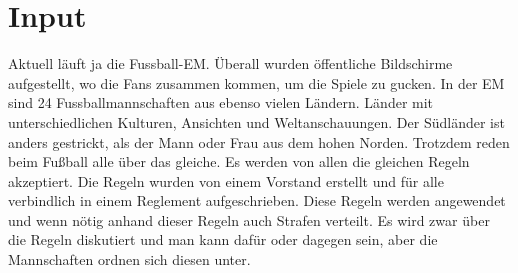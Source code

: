 \documentclass[12pt,a4paper]{scrarticle}
\begin{document}
\section{ Input }
\begin{spacing}{1.5}
Aktuell läuft ja die Fussball-EM. Überall wurden öffentliche Bildschirme aufgestellt, wo die Fans zusammen kommen, um die Spiele zu gucken. 
In der EM sind 24 Fussballmannschaften aus ebenso vielen Ländern. Länder mit unterschiedlichen Kulturen, Ansichten und Weltanschauungen. Der Südländer ist anders gestrickt, als der Mann oder Frau aus dem hohen Norden. Trotzdem reden beim Fußball alle über das gleiche. Es werden von allen die gleichen Regeln akzeptiert. Die Regeln wurden von einem Vorstand erstellt und für alle verbindlich in einem Reglement aufgeschrieben. Diese Regeln werden angewendet und wenn nötig anhand dieser Regeln auch Strafen verteilt. Es wird zwar über die Regeln diskutiert und man kann dafür oder dagegen sein, aber die Mannschaften ordnen sich diesen unter.


\end{spacing}
\end{document}
